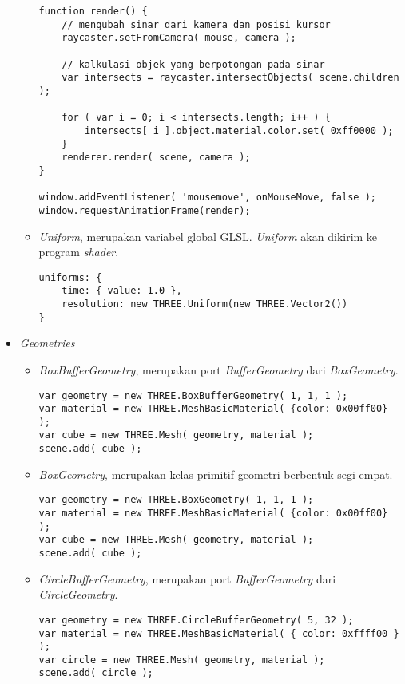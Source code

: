 \begin{itemize}
\begin{itemize}
\begin{lstlisting}
function render() {
	// mengubah sinar dari kamera dan posisi kursor
	raycaster.setFromCamera( mouse, camera );

	// kalkulasi objek yang berpotongan pada sinar
	var intersects = raycaster.intersectObjects( scene.children );

	for ( var i = 0; i < intersects.length; i++ ) {
		intersects[ i ].object.material.color.set( 0xff0000 );
	}
	renderer.render( scene, camera );
}

window.addEventListener( 'mousemove', onMouseMove, false );
window.requestAnimationFrame(render);
\end{lstlisting}
	
	\item{\it Uniform}, merupakan variabel global GLSL. {\it Uniform} akan dikirim ke program {\it shader}.
	
\begin{lstlisting}
uniforms: {
	time: { value: 1.0 },
	resolution: new THREE.Uniform(new THREE.Vector2())
}
\end{lstlisting}
	
	\end{itemize}
	
\item \textit{Geometries}
	\begin{itemize}
	\item {\it BoxBufferGeometry}, merupakan port {\it BufferGeometry} dari {\it BoxGeometry}.
	
\begin{lstlisting}
var geometry = new THREE.BoxBufferGeometry( 1, 1, 1 );
var material = new THREE.MeshBasicMaterial( {color: 0x00ff00} );
var cube = new THREE.Mesh( geometry, material );
scene.add( cube );
\end{lstlisting}

	\item {\it BoxGeometry}, merupakan kelas primitif geometri berbentuk segi empat.
	
\begin{lstlisting}
var geometry = new THREE.BoxGeometry( 1, 1, 1 );
var material = new THREE.MeshBasicMaterial( {color: 0x00ff00} );
var cube = new THREE.Mesh( geometry, material );
scene.add( cube );
\end{lstlisting}
	
	\item {\it CircleBufferGeometry}, merupakan port {\it BufferGeometry} dari {\it CircleGeometry}.
	
\begin{lstlisting}
var geometry = new THREE.CircleBufferGeometry( 5, 32 );
var material = new THREE.MeshBasicMaterial( { color: 0xffff00 } );
var circle = new THREE.Mesh( geometry, material );
scene.add( circle );
\end{lstlisting}
	

\end{itemize}
\end{itemize}
